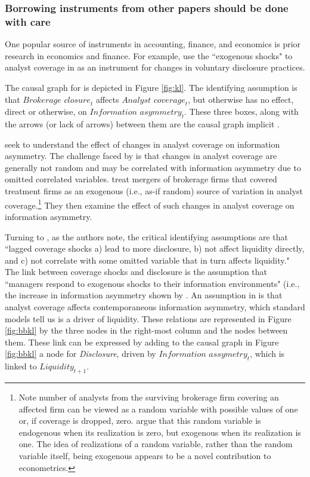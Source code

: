 \documentclass[11pt,reqno]{amsart}
\begin{document}
\subsubsection{Borrowing instruments from other papers should be done with care}
One popular source of instruments in accounting, finance, and economics is prior research in economics and finance.
For example, \citet{Balakrishnan:2014js} use the ``exogenous shocks" to analyst coverage in \citet{Kelly:2012ih} as an instrument for changes in voluntary disclosure practices. 

The causal graph for \citet{Kelly:2012ih} is depicted in Figure \ref{fig:kl}.
The identifying assumption is that $\textit{Brokerage closure}_t$ affects $\textit{Analyst coverage}_t$, but otherwise has no effect, direct or otherwise, on $\textit{Information asymmetry}_t$.
These three boxes, along with the arrows (or lack of arrows) between them are the causal graph implicit \citet{Kelly:2012ih}.


\citet{Kelly:2012ih} seek to understand the effect of changes in analyst coverage on information asymmetry. 
The challenge faced by \citet{Kelly:2012ih} is that changes in analyst coverage are generally not random and may be correlated with information asymmetry due to omitted correlated variables.
\citet{Kelly:2012ih} treat mergers of brokerage firms that covered treatment firms as an exogenous (i.e., as-if random) source of variation in analyst coverage.\footnote{Note number of analysts from the surviving brokerage firm covering an affected firm can be viewed as a random variable with possible values of one or, if coverage is dropped, zero. \citet{Kelly:2012ih} argue that this random variable is endogenous when its realization is zero, but exogenous when its realization is one. 
The idea of realizations of a random variable, rather than the random variable itself, being exogenous appears to be a novel contribution to econometrics.} 
They then examine the effect of such changes in analyst coverage on information asymmetry.

Turning to \citet{Balakrishnan:2014js}, as the authors note, the critical identifying assumptions are that ``lagged coverage shocks a) lead to more disclosure, b) not affect liquidity directly, and c) not correlate with some omitted variable that in turn affects liquidity." 
The link between coverage shocks and disclosure is the assumption that ``managers respond to exogenous shocks to their information environments" (i.e., the increase in information asymmetry shown by  \citet{Kelly:2012ih}.
An assumption in \citet{Kelly:2012ih} is that analyst coverage affects contemporaneous information asymmetry, which standard models tell us is a driver of liquidity.
These relations are represented in Figure \ref{fig:bbkl} by the three nodes in the right-most column and the nodes between them.
These link can be expressed by adding to the causal graph in Figure \ref{fig:bbkl} a node for \textit{Disclosure}, driven by $\textit{Information assymetry}_t$, which is linked to $\textit{Liquidity}_{t+1}$.
\end{document}
